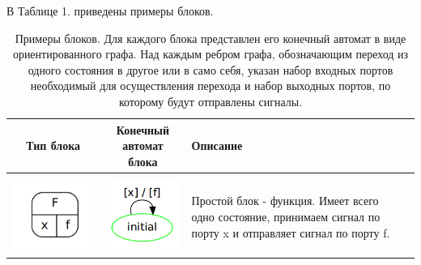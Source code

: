 \documentclass[a4paper,12pt]{article}
\begin{document}
В Таблице 1. приведены примеры блоков.
\begin{table}[!hp]
\centering
\medskip
\caption{Примеры блоков. Для каждого блока представлен его конечный автомат в виде ориентированного графа. Над каждым ребром графа, обозначающим переход из одного состояния в другое или в само себя,  указан набор входных портов необходимый для осуществления перехода и набор выходных портов, по которому будут отправлены сигналы.}
\begin{tabular}{c|c|>{\centering}m{5cm} l}
\hline
Тип блока & Конечный автомат блока & Описание & ~\\ \hline \hline\\


\includegraphics[scale=0.25]{f_block.png}&
\includegraphics[scale=0.35]{f_fa.png}&
\footnotesize{Простой блок - функция. Имеет всего одно состояние, принимаем сигнал по порту x и отправляет сигнал по порту f.\\}& ~


\end{tabular}
\end{table}
\end{document}
